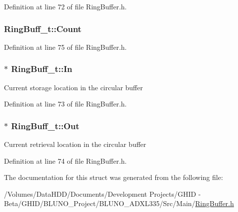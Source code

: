 \-Definition at line 72 of file \-Ring\-Buffer.\-h.

\hypertarget{struct_ring_buff__t_a41a9ebbce17afd63c9b1052b9374ab7f}{
\subsubsection[{\-Count}]{ {\bf \-Ring\-Buff\-\_\-t\-::\-Count}}}\label{struct_ring_buff__t_a41a9ebbce17afd63c9b1052b9374ab7f}


\-Definition at line 75 of file \-Ring\-Buffer.\-h.

\hypertarget{struct_ring_buff__t_ace48fed7a87967d5de48671dcd356ac6}{
\subsubsection[{\-In}]{$\ast$ {\bf \-Ring\-Buff\-\_\-t\-::\-In}}}\label{struct_ring_buff__t_ace48fed7a87967d5de48671dcd356ac6}
\-Current storage location in the circular buffer 

\-Definition at line 73 of file \-Ring\-Buffer.\-h.

\hypertarget{struct_ring_buff__t_adff6acf088e2c9697b9f19fb9ff91739}{
\subsubsection[{\-Out}]{$\ast$ {\bf \-Ring\-Buff\-\_\-t\-::\-Out}}}\label{struct_ring_buff__t_adff6acf088e2c9697b9f19fb9ff91739}
\-Current retrieval location in the circular buffer 

\-Definition at line 74 of file \-Ring\-Buffer.\-h.



\-The documentation for this struct was generated from the following file\-:\begin{DoxyCompactItemize}
\item 
/\-Volumes/\-Data\-H\-D\-D/\-Documents/\-Development Projects/\-G\-H\-I\-D -\/ Beta/\-G\-H\-I\-D/\-B\-L\-U\-N\-O\-\_\-\-Project/\-B\-L\-U\-N\-O\-\_\-\-A\-D\-X\-L335/\-Src/\-Main/\hyperlink{_ring_buffer_8h}{\-Ring\-Buffer.\-h}\end{DoxyCompactItemize}
